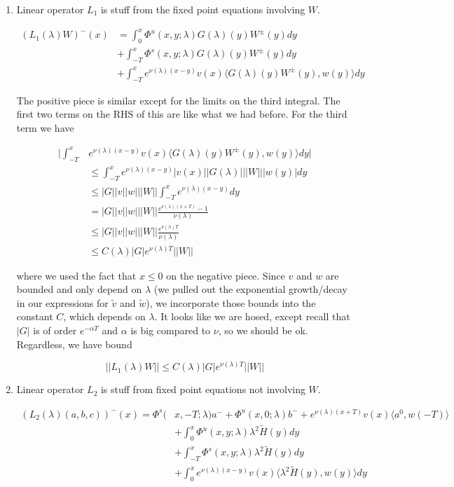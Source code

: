 \documentclass[12pt]{article}
\begin{document}
\begin{enumerate}

\item Linear operator $L_1$ is stuff from the fixed point equations involving $W$.

\begin{align*}
(L_1(\lambda)W)^-(x) &= \int_0^x \Phi^u(x, y; \lambda) G(\lambda)(y)W^\pm(y) dy \\
&+ \int_{-T}^x \Phi^s(x, y; \lambda) G(\lambda)(y)W^\pm(y) dy \\
&+ \int_{-T}^x 
e^{\nu(\lambda)(x-y)} v(x) \langle G(\lambda)(y)W^\pm(y), w(y) \rangle dy 
\end{align*}

The positive piece is similar except for the limits on the third integral. The first two terms on the RHS of this are like what we had before. For the third term we have

\begin{align*}
\Big| \int_{-T}^x &e^{\nu(\lambda)(x-y)} v(x) \langle G(\lambda)(y)W^\pm(y), w(y) \rangle dy \Big| \\
&\leq \int_{-T}^x e^{\nu(\lambda)(x-y)} |v(x)| |G(\lambda)|||W|||w(y)|dy \\
&\leq |G||v||w|||W|| \int_{-T}^x e^{\nu(\lambda)(x-y)} dy \\
&= |G||v||w|||W|| \frac{e^{\nu(\lambda)(x+T)} - 1}{\nu(\lambda)} \\
&\leq |G||v||w|||W|| \frac{e^{\nu(\lambda)T}}{\nu(\lambda)} \\
&\leq C(\lambda) |G| e^{\nu(\lambda)T} ||W||
\end{align*}

where we used the fact that $x \leq 0$ on the negative piece. Since $v$ and $w$ are bounded and only depend on $\lambda$ (we pulled out the exponential growth/decay in our expressions for $\tilde{v}$ and $\tilde{w}$), we incorporate those bounds into the constant $C$, which depends on $\lambda$. It looks like we are hosed, except recall that $|G|$ is of order $e^{-\alpha T}$ and $\alpha$ is big compared to $\nu$, so we should be ok. Regardless, we have bound

\[
||L_1(\lambda)W|| \leq C(\lambda) |G| e^{\nu(\lambda)T} ||W||
\]

\item Linear operator $L_2$ is stuff from fixed point equations not involving $W$.


\begin{align*}
(L_2(\lambda)(a,b,c))^-(x) = \Phi^s(&x, -T; \lambda)a^- + \Phi^u(x, 0; \lambda)b^- + e^{\nu(\lambda)(x+T)} v(x) \langle a^0, w(-T) \rangle   \\
&+ \int_0^x \Phi^u(x, y; \lambda) \lambda^2 \tilde{H}(y) dy \\
&+ \int_{-T}^x \Phi^s(x, y; \lambda) \lambda^2 \tilde{H}(y) dy \\
&+ \int_0^x 
e^{\nu(\lambda)(x-y)} v(x) \langle \lambda^2 \tilde{H}(y), w(y) \rangle dy
\end{align*}


\end{enumerate}
\end{document}
